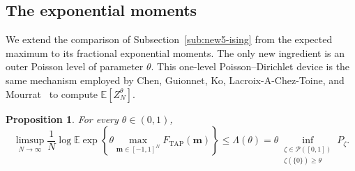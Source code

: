 \documentclass[a4paper,10pt,reqno]{amsart}
\numberwithin{equation}{section}
\newtheorem{proposition}{Proposition}[section]
\newcommand{\dE}{\mathbb{E}}%
\newcommand{\mc}{\mathcal}
\newcommand{\TAP}{\mathrm{TAP}}
\newcommand{\bfm}{\mathbf{m}}
\begin{document}
	
	
	\subsection{The exponential moments}
	We extend the comparison of Subsection~\ref{sub:new5-ising} from the expected maximum to its fractional
	exponential moments. The only new ingredient is an outer Poisson level of parameter $\theta$. This one-level Poisson--Dirichlet device is the same mechanism employed by Chen, Guionnet, Ko,
	Lacroix-A-Chez-Toine, and Mourrat~\cite{ChenGuionnetKoLacroixMourrat} to compute $\dE[Z_N^\theta]$.
	
	\begin{proposition}\label{prop:direct-tilt-TAP}
		For every $\theta\in(0,1)$,
		\[
		\limsup_{N\to\infty}
		\frac1N
		\log\dE\exp\left\{
		\theta\max_{\bfm\in[-1,1]^N}F_{\TAP}(\bfm)
		\right\}
		\le
		\Lambda(\theta)
		=
		\theta
		\inf_{\substack{\zeta\in\mc P([0,1])\\
				\zeta(\{0\})\ge\theta}}
		P_\zeta.
		\]
	\end{proposition}
	
\end{document}
